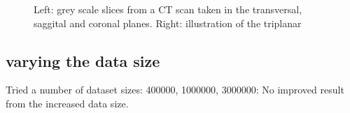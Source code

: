 \begin{figure}
\centering
\begin{minipage}{0.45\textwidth}
\centering
{}
\end{minipage}\hfill
\hspace{-1cm}
\begin{minipage}{0.45\textwidth}
\centering
{}
\end{minipage}
\caption{Left: grey scale slices from a CT scan taken in the transversal, saggital and coronal planes. Right: illustration of the triplanar}
\end{figure}

\subsection{varying the data size}

Tried a number of dataset sizes: 400000, 1000000, 3000000: No improved result from the increased data size.



